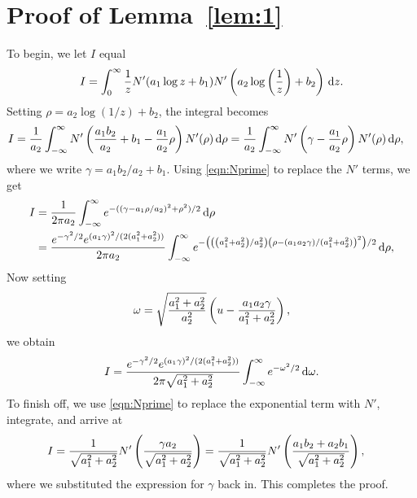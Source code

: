 \section{Proof of Lemma~\ref{lem:1}}
To begin, we let $I$ equal
	\begin{equation*}
		I = \int_0^\infty \frac{1}{z}N'(a_1\log z + b_1)N'\left(a_2\log\left( \frac{1}{z} \right) + b_2 \right) \, \mathrm d z.
	\end{equation*}
Setting $\rho = a_2\log\left( 1/z \right) + b_2$, the integral becomes
	\begin{align*}
		I &= \frac{1}{a_2}\int_{-\infty}^\infty N'\left( \frac{a_1b_2}{a_2} + b_1 - \frac{a_1}{a_2}\rho \right)N'(\rho) \, \mathrm d \rho =  \frac{1}{a_2}\int_{-\infty}^\infty N'\left(\gamma - \frac{a_1}{a_2}\rho \right)N'(\rho) \, \mathrm d \rho,
	\end{align*}
where we write $\gamma = a_1b_2/a_2 + b_1$. Using \eqref{eqn:Nprime} to replace the $N'$ terms, we get
	\begin{align*}
		I &= \frac{1}{2\pi a_2}\int_{-\infty}^\infty e^{-(\left(\gamma- a_1\rho/a_2\right)^2 + \rho^2)/2} \, \mathrm d \rho \\
		&= \frac{e^{-\gamma^2/2}e^{(a_1\gamma)^2/(2(a_1^2+a_2^2))}}{2\pi a_2}\int_{-\infty}^\infty e^{-\left( \left(\left(a_1^2+a_2^2\right)/a_2^2\right)\left( \rho - (a_1a_2\gamma)/(a_1^2+a_2^2) \right)^2 \right)/2} \, \mathrm d \rho,
	\end{align*}
Now setting
	$$
		\omega = \sqrt{\frac{a_1^2+a_2^2}{a_2^2}}\left( u - \frac{a_1a_2\gamma}{a_1^2+a_2^2} \right),
	$$
we obtain
	$$
		I = \frac{e^{-\gamma^2/2}e^{(a_1\gamma)^2/(2(a_1^2+a_2^2))}}{2\pi \sqrt{a_1^2+a_2^2}}\int_{-\infty}^\infty e^{-\omega^2/2} \, \mathrm d\omega.
	$$
To finish off, we use \eqref{eqn:Nprime} to replace the exponential term with $N'$, integrate, and arrive at
	\begin{align*}
		I &= \frac{1}{\sqrt{a_1^2 + a_2^2}}N'\left( \frac{\gamma a_2}{\sqrt{a_1^2+a_2^2}} \right) =\frac{1}{\sqrt{a_1^2 + a_2^2}}N'\left( \frac{a_1b_2 + a_2b_1}{\sqrt{a_1^2+a_2^2}} \right),
	\end{align*}
where we substituted the expression for $\gamma$ back in. This completes the proof.

